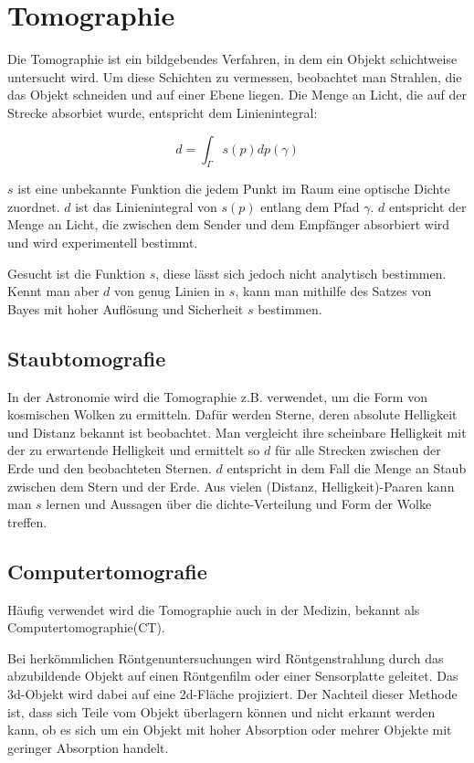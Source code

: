 \section{Tomographie}\label{k4.2.comptomo.ct}

Die Tomographie ist ein bildgebendes Verfahren, in dem ein Objekt schichtweise untersucht wird. Um diese Schichten zu vermessen, beobachtet man Strahlen, die das Objekt schneiden und auf einer Ebene liegen. Die Menge an Licht, die auf der Strecke absorbiet wurde, entspricht dem Linienintegral:

$$d=\int_{\Gamma}{}s(p)dp(\gamma)$$

$s$ ist eine unbekannte Funktion die jedem Punkt im Raum eine optische Dichte zuordnet. $d$ ist das Linienintegral von $s(p)$ entlang dem Pfad $\gamma$. $d$ entspricht der Menge an Licht, die zwischen dem Sender und dem Empfänger absorbiert wird und wird experimentell bestimmt.

Gesucht ist die Funktion $s$, diese lässt sich jedoch nicht analytisch bestimmen. Kennt man aber $d$ von genug Linien in $s$, kann man mithilfe des Satzes von Bayes mit hoher Auflösung und Sicherheit $s$ bestimmen.

\subsection{Staubtomografie}

In der Astronomie wird die Tomographie z.B. verwendet, um die Form von kosmischen Wolken zu ermitteln. Dafür werden Sterne, deren absolute Helligkeit und Distanz bekannt ist beobachtet. Man vergleicht ihre scheinbare Helligkeit mit der zu erwartende Helligkeit und ermittelt so $d$ für alle Strecken zwischen der Erde und den beobachteten Sternen. $d$ entspricht in dem Fall die Menge an Staub zwischen dem Stern und der Erde. Aus vielen (Distanz, Helligkeit)-Paaren kann man $s$ lernen und Aussagen über die dichte-Verteilung und Form der Wolke treffen.

\subsection{Computertomografie}

Häufig verwendet wird die Tomographie auch in der Medizin, bekannt als Computertomographie(CT).

Bei herkömmlichen Röntgenuntersuchungen wird Röntgenstrahlung durch das abzubildende Objekt auf einen Röntgenfilm oder einer Sensorplatte geleitet. Das 3d-Objekt wird dabei auf eine 2d-Fläche projiziert. Der Nachteil dieser Methode ist, dass sich Teile vom Objekt überlagern können und nicht erkannt werden kann, ob es sich um ein Objekt mit hoher Absorption oder mehrer Objekte mit geringer Absorption handelt.

